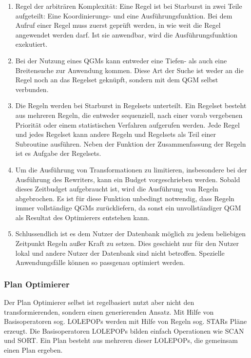 \begin{enumerate}
\item Regel der arbiträren Komplexität: Eine Regel ist bei Starburst in zwei Teile aufgeteilt: Eine Koordinierungs- und eine Ausführungsfunktion. Bei dem Aufruf einer Regel muss zuerst geprüft werden, in wie weit die Regel angewendet werden darf. Ist sie anwendbar, wird die Ausführungsfunktion exekutiert.

\item Bei der Nutzung eines \ac{QGM}s kann entweder eine Tiefen- als auch eine Breitensuche zur Anwendung kommen. Diese Art der Suche ist weder an die Regel noch an das Regelset geknüpft, sondern mit dem QGM selbst verbunden.


\item Die Regeln werden bei Starburst in Regelsets unterteilt. Ein Regelset besteht aus mehreren Regeln, die entweder sequenziell, nach einer vorab vergebenen Priorität oder einem statistischen Verfahren aufgerufen werden. Jede Regel und jedes Regelset kann andere Regeln und Regelsets als Teil einer Subroutine ausführen. Neben der Funktion der Zusammenfassung der Regeln ist es Aufgabe der Regelsets.

\item Um die Ausführung von Transformationen zu limitieren, insbesondere bei der Ausführung des Rewriters, kann ein Budget vorgeschrieben werden. Sobald dieses Zeitbudget aufgebraucht ist, wird die Ausführung von Regeln abgebrochen. Es ist für diese Funktion unbedingt notwendig, dass Regeln immer vollständige QGMs zurückliefern, da sonst ein unvollständiger QGM als Resultat des Optimierers entstehen kann.

\item Schlussendlich ist es dem Nutzer der Datenbank möglich zu jedem beliebigen Zeitpunkt Regeln außer Kraft zu setzen. Dies geschieht nur für den Nutzer lokal und andere Nutzer der Datenbank sind nicht betroffen. Spezielle Anwendungsfälle können so passgenau optimiert werden.
\end{enumerate}

\subsubsection{Plan Optimierer}

Der Plan Optimierer selbst ist regelbasiert nutzt aber nicht den transformierenden, sondern einen generierenden Ansatz. Mit Hilfe von Basisoperatoren sog. \ac{LOLEPOP}s werden mit Hilfe von Regeln sog. \ac{STAR}s Pläne erzeugt. Die Basisoperatoren \ac{LOLEPOP}s bilden einfach Operationen wie SCAN und SORT. Ein Plan besteht aus mehreren dieser \ac{LOLEPOP}s, die gemeinsam einen Plan ergeben.

